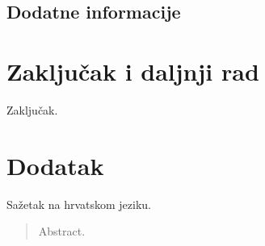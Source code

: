 \documentclass[times, utf8, diplomski]{fer}
\begin{document}
\section {Dodatne informacije}

\chapter{Zaključak i daljnji rad}
Zaključak.

\chapter{Dodatak}




\begin{sazetak}
Sažetak na hrvatskom jeziku.

\end{sazetak}

\begin{abstract}
Abstract.

\end{abstract}
\end{document}
